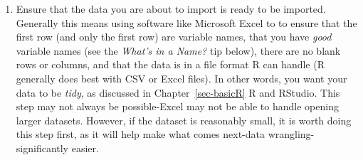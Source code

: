 \documentclass[
  letterpaper,
]{book}
\providecommand{\tightlist}{%
  \setlength{\itemsep}{0pt}\setlength{\parskip}{0pt}}\usepackage{longtable,booktabs,array}
\begin{document}
\begin{enumerate}
\def\labelenumi{\arabic{enumi}.}
\tightlist
\item
  Ensure that the data you are about to import is ready to be imported.
  Generally this means using software like Microsoft Excel to to ensure
  that the first row (and only the first row) are variable names, that
  you have \emph{good} variable names (see the \emph{What's in a Name?}
  tip below), there are no blank rows or columns, and that the data is
  in a file format R can handle (R generally does best with CSV or Excel
  files). In other words, you want your data to be \emph{tidy}, as
  discussed in Chapter~\ref{sec-basicR} R and RStudio. This step may not
  always be possible-Excel may not be able to handle opening larger
  datasets. However, if the dataset is reasonably small, it is worth
  doing this step first, as it will help make what comes next-data
  wrangling-significantly easier.
\end{enumerate}
\end{document}
